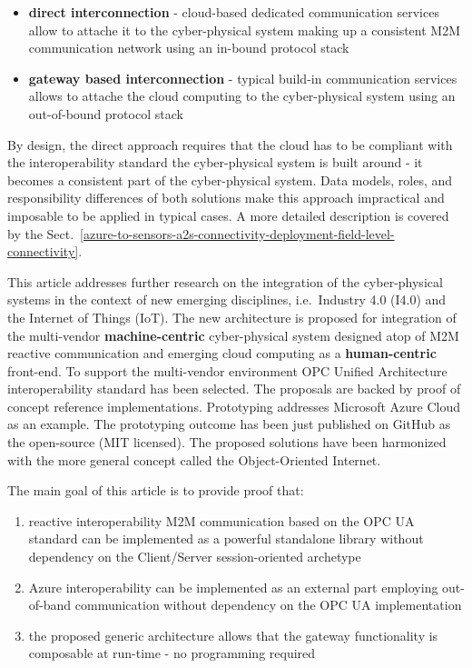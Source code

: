 \documentclass{jacsart}
\providecommand{\tightlist} { \setlength{\itemsep}{0pt}\setlength{\parskip}{0pt}}
\begin{document}
\begin{itemize}
\tightlist
\item
  \textbf{direct interconnection} - cloud-based dedicated communication
  services allow to attache it to the cyber-physical system making up a
  consistent M2M communication network using an in-bound protocol stack
\item
  \textbf{gateway based interconnection} - typical build-in
  communication services allows to attache the cloud computing to the
  cyber-physical system using an out-of-bound protocol stack
\end{itemize}

By design, the direct approach requires that the cloud has to be
compliant with the interoperability standard the cyber-physical system
is built around - it becomes a consistent part of the cyber-physical
system. Data models, roles, and responsibility differences of both
solutions make this approach impractical and imposable to be applied in
typical cases. A more detailed description is covered by the Sect.~\ref*{azure-to-sensors-a2s-connectivity-deployment-field-level-connectivity}.

This article addresses further research on the integration of the
cyber-physical systems in the context of new emerging disciplines,
i.e.~Industry 4.0 (I4.0) and the Internet of Things (IoT). The new
architecture is proposed for integration of the multi-vendor
\textbf{machine-centric} cyber-physical system designed atop of M2M
reactive communication and emerging cloud computing as a
\textbf{human-centric} front-end. To support the multi-vendor
environment OPC Unified Architecture interoperability standard has been
selected. The proposals are backed by proof of concept reference
implementations. Prototyping addresses Microsoft Azure Cloud as an
example. The prototyping outcome has been just published on GitHub as
the open-source (MIT licensed). The proposed solutions have been
harmonized with the more general concept called the Object-Oriented
Internet.

The main goal of this article is to provide proof that:

\begin{enumerate}
\def\labelenumi{\arabic{enumi}.}
\tightlist
\item
  reactive interoperability M2M communication based on the OPC UA
  standard can be implemented as a powerful standalone library without
  dependency on the Client/Server session-oriented archetype
\item
  Azure interoperability can be implemented as an external part
  employing out-of-band communication without dependency on the OPC UA
  implementation
\item
  the proposed generic architecture allows that the gateway
  functionality is composable at run-time - no programming required
\end{enumerate}
\end{document}
